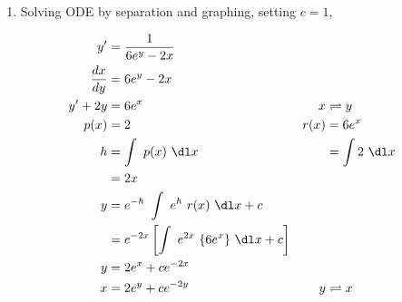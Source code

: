 \begin{enumerate}
    \item Solving ODE by separation and graphing, setting $ c = 1 $,

          \begin{align}
              y'            & = \frac{1}{6e^{y} - 2x}                     \\
              \frac{dx}{dy} & = 6e^{y} - 2x                               \\
              y' + 2y       & = 6e^{x}                                  &
              x             & \rightleftharpoons y                        \\
              p(x)          & = 2                                       &
              r(x)          & = 6e^{x}                                    \\
              h             & = \int\ p(x)\ \dl x                       &
                            & = \int 2\ \dl x                             \\
                            & = 2x                                        \\
              y             & = e^{-h}\ \int\ e^{h}\ r(x)\ \dl x + c      \\
                            & = e^{-2x} \left[ \int\ e^{2x}\ \{6e^{x}\}
              \ \dl x + c \right]                                         \\
              y             & =  2e^{x} + ce^{-2x}                        \\
              x             & = 2e^{y} + ce^{-2y}                       &
              y             & \rightleftharpoons x
          \end{align}


\end{enumerate}
